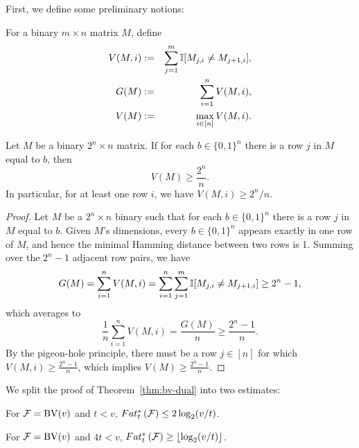 \documentclass[12pt,a4paper,oneside,onecolumn]{book}
\begin{document}
First, we define some preliminary notions:

\begin{definition}
  For a binary $m \times n$ matrix $M$, define
  \begin{eqnarray*}
    V(M, i) &:=& \sum_{j=1}^m \mathbb{I}[M_{j,i} \neq M_{j+1,i}],\\
    G(M) &:=& \sum_{i=1}^n V(M,i),\\
    V(M) &:=& \max_{i \in [n]}V(M,i).
\end{eqnarray*}
\end{definition}

\begin{lemma} \label{lemma:1}
  Let $M$ be a binary $2^n \times n$ matrix.
  If
for each
$b \in \{0,1\}^n$
there is a row $j$ in $M$
equal to $b$,
then
\[V(M) \geq \frac{2^n}{n}.\]
In particular,
for at least one row $i$,
we have
$V(M,i) \geq 2^n/n$.
\end{lemma}

\begin{proof}
  Let $M$ be a $2^n \times n$
  binary
  such that
for each
$b \in \{0,1\}^n$
there is a row $j$ in $M$
equal to $b$.  
Given $M$'s dimensions,
every
$b \in \{0,1\}^n$ appears exactly in one row of $M$,
and hence
the minimal Hamming distance between two rows is 1.
Summing over the $2^n-1$ adjacent row pairs, we have
\[G(M) = \sum_{i=1}^n V(M,i) = \sum_{i=1}^n\sum_{j=1}^m \mathbb{I}[M_{j,i} \neq M_{j+1,i}] \geq 2^n-1,\]
which averages to
\[\frac{1}{n} \sum_{i=1}^n V(M,i) = \frac{G(M)}{n} \geq \frac{2^n-1}{n} .\]
By
the pigeon-hole principle,
there must be
a row $j \in [n]$ for which
$V(M,i) \geq \frac{2^n-1}{n}$,
which implies
$V(M)  \geq \frac{2^n-1}{n}$.
\end{proof}
We split the proof of Theorem~\ref{thm:bv-dual} into two estimates:

\begin{lemma} \label{lem:bv-ub}
  For $\mathcal{F}=\mathrm{BV}(v)$ and $t<v$,
  $Fat^*_{t}\left(\mathcal{F}\right)\le2\log_2(v/t)$.
\end{lemma}

\begin{lemma} \label{lem:bv-lb}
  For $\mathcal{F}=\mathrm{BV}(v)$ and $4t<v$,
  $Fat^*_{t}\left(\mathcal{F}\right)\ge\left\lfloor\log_2(v/t)\right\rfloor$.
\end{lemma}
\end{document}
